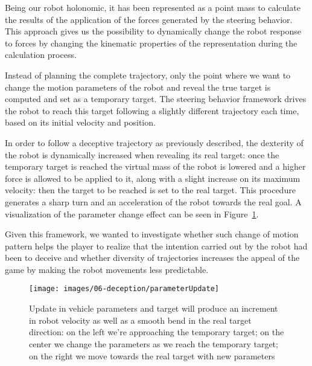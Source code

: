 Being our robot holonomic, it has been represented as a point mass to calculate the results of the application of the forces generated by the steering behavior. This approach gives us the possibility to dynamically change the robot response to forces by changing the kinematic properties of the representation during the calculation process.

Instead of planning the complete trajectory, only the point where we want to change the motion parameters of the robot and reveal the true target is computed and set as a temporary target. The steering behavior framework drives the robot to reach this target following a slightly different trajectory each time, based on its initial velocity and position.

In order to follow a deceptive trajectory as previously described, the dexterity of the robot is dynamically increased when revealing its real target: once the temporary target is reached the virtual mass of the robot is lowered and a higher force is allowed to be applied to it, along with a slight increase on its maximum velocity: then the target to be reached is set to the real target. This procedure generates a sharp turn and an acceleration of the robot towards the real goal. A visualization of the parameter change effect can be seen in Figure~\ref{fig::trajectorySteering}. 

Given this framework, we wanted to investigate whether such change of motion pattern helps the player to realize that the intention carried out by the robot had been to deceive and whether diversity of trajectories increases the appeal of the game by making the robot movements less predictable.

\begin{figure}[htbp]
    \centering
    \texttt{[image: images/06-deception/parameterUpdate]}
    \caption{Update in vehicle parameters and target will produce an increment in robot velocity as well as a smooth bend in the real target direction: on the left we're approaching the temporary target; on the center we change the parameters as we reach the temporary target; on the right we move towards the real target with new parameters}
    \label{fig::trajectorySteering}
\end{figure}


